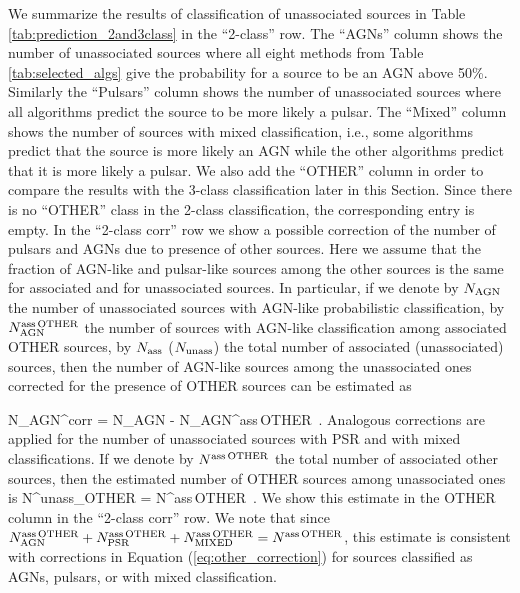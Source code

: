 We summarize the results of classification of unassociated sources in Table \ref{tab:prediction_2and3class} in the ``2-class'' row.
The ``AGNs'' column shows the number of unassociated sources where all eight methods from Table \ref{tab:selected_algs} 
give the probability for a source to be an AGN above 50\%.
Similarly the ``Pulsars'' column shows the number of unassociated sources where all algorithms predict the source to be more likely a pulsar.
The ``Mixed'' column shows the number of sources with mixed classification, i.e., some algorithms predict that the source is more likely an AGN while the other algorithms predict that it is more likely a pulsar.
We also add the ``OTHER'' column in order to compare the results with the 3-class classification later in this Section.
Since there is no ``OTHER'' class in the 2-class classification, the corresponding entry is empty.
In the ``2-class corr'' row we show a possible correction of the number of pulsars and AGNs due to presence of other sources.
Here we assume that the fraction of AGN-like and pulsar-like sources among the other sources is the same for associated and for unassociated sources.
In particular, if we denote by $N_{\rm AGN}$ the number of unassociated sources with AGN-like probabilistic classification,
by $N_{\rm AGN}^{\rm ass\,OTHER}$ the number of sources with AGN-like classification among associated OTHER sources,
by $N_{\rm ass}$ ($N_{\rm unass}$) the total number of associated (unassociated) sources, then
the number of AGN-like sources among the unassociated ones corrected for the presence of OTHER sources can be estimated as

\be
{}
N_{\rm AGN}^{\rm corr} = N_{\rm AGN} - N_{\rm AGN}^{\rm ass\,OTHER} \,.
\ee
Analogous corrections are applied for the number of unassociated sources with PSR and with mixed classifications.
If we denote by $N^{\rm ass\,OTHER}$ the total number of associated other sources, then the estimated number of 
OTHER sources among unassociated ones is
\be
{}
N^{\rm unass}_{\rm OTHER} = N^{\rm ass\,OTHER} \,.
\ee
We show this estimate in the OTHER column in the ``2-class corr'' row.
We note that since 
$N_{\rm AGN}^{\rm ass\,OTHER} + N_{\rm PSR}^{\rm ass\,OTHER} + N_{\rm MIXED}^{\rm ass\,OTHER} = N^{\rm ass\,OTHER}$,
this estimate is consistent with corrections in Equation (\ref{eq:other_correction}) for sources classified as AGNs, pulsars, or with mixed classification.


